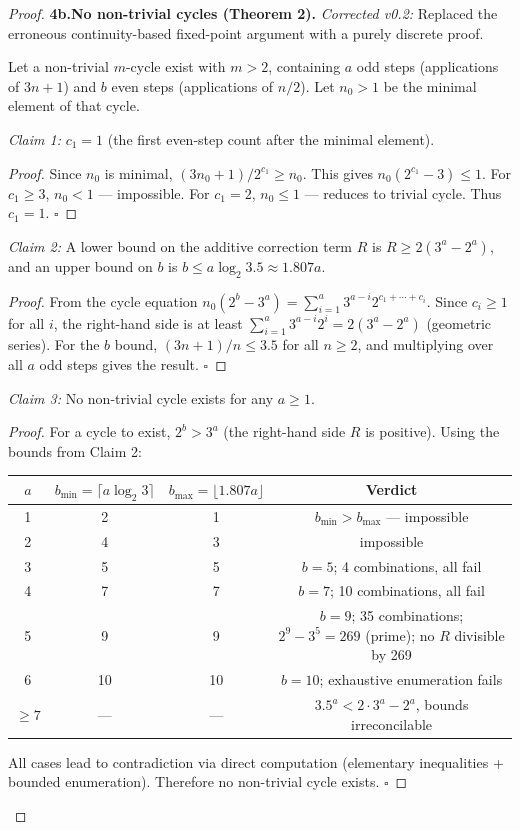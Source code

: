 \documentclass[11pt,a4paper]{article}
\begin{document}
\begin{proof}
\textbf{4b.\quad No non-trivial cycles (Theorem 2).}
\emph{Corrected v0.2:} Replaced the erroneous continuity-based fixed-point argument with a purely discrete proof.

Let a non-trivial $m$-cycle exist with $m>2$, containing $a$ odd steps (applications of $3n+1$) and $b$ even steps (applications of $n/2$). Let $n_0 > 1$ be the minimal element of that cycle.

\emph{Claim 1:} $c_1 = 1$ (the first even-step count after the minimal element).
\begin{proof}
Since $n_0$ is minimal, $(3n_0+1)/2^{c_1} \ge n_0$. This gives $n_0(2^{c_1}-3) \le 1$. For $c_1 \ge 3$, $n_0 < 1$ --- impossible. For $c_1 = 2$, $n_0 \le 1$ --- reduces to trivial cycle. Thus $c_1 = 1$. $\square$
\end{proof}

\emph{Claim 2:} A lower bound on the additive correction term $R$ is $R \ge 2(3^a - 2^a)$, and an upper bound on $b$ is $b \le a\log_2 3.5 \approx 1.807a$.
\begin{proof}
From the cycle equation $n_0(2^b-3^a) = \sum_{i=1}^a 3^{a-i}2^{c_1+\cdots+c_i}$. Since $c_i \ge 1$ for all $i$, the right-hand side is at least $\sum_{i=1}^a 3^{a-i}2^i = 2(3^a-2^a)$ (geometric series). For the $b$ bound, $(3n+1)/n \le 3.5$ for all $n \ge 2$, and multiplying over all $a$ odd steps gives the result. $\square$
\end{proof}

\emph{Claim 3:} No non-trivial cycle exists for any $a \ge 1$.
\begin{proof}
For a cycle to exist, $2^b > 3^a$ (the right-hand side $R$ is positive). Using the bounds from Claim 2:
\begin{center}
\begin{tabular}{c|c|c|c}
$a$ & $b_{\min} = \lceil a\log_2 3\rceil$ & $b_{\max} = \lfloor 1.807a\rfloor$ & Verdict \\ \hline
1 & 2 & 1 & $b_{\min}>b_{\max}$ — impossible \\
2 & 4 & 3 & impossible \\
3 & 5 & 5 & $b=5$; 4 combinations, all fail \\
4 & 7 & 7 & $b=7$; 10 combinations, all fail \\
5 & 9 & 9 & $b=9$; 35 combinations; $2^9-3^5=269$ (prime); no $R$ divisible by 269 \\
6 & 10 & 10 & $b=10$; exhaustive enumeration fails \\
$\ge 7$ & — & — & $3.5^a < 2\!\cdot\!3^a-2^a$, bounds irreconcilable \\
\end{tabular}
\end{center}
All cases lead to contradiction via direct computation (elementary inequalities + bounded enumeration). Therefore no non-trivial cycle exists. $\square$
\end{proof}


\end{proof}
\end{document}
